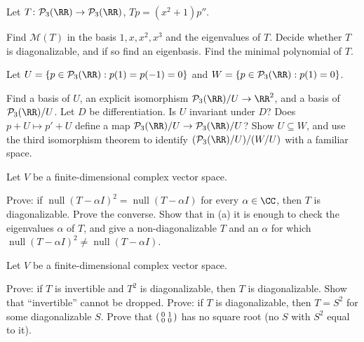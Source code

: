 \documentclass[10pt]{scrartcl}
\DeclareMathOperator{\nul}{null}
\newcommand{\PP}{\mathcal P}
\newcommand{\MM}{\mathcal M}
\begin{document}
\begin{problem}
  Let $T\colon\PP_3(\RR)\to\PP_3(\RR)$, $Tp=(x^2+1)p''$.
  \begin{enumerate}[(a)]
    \ii Find $\MM(T)$ in the basis $1,x,x^2,x^3$ and the eigenvalues of $T$.
    \ii Decide whether $T$ is diagonalizable, and if so find an eigenbasis.
    \ii Find the minimal polynomial of $T$.
  \end{enumerate}
\end{problem}

\begin{problem}[$\star$ A quotient of $\PP_3(\RR)$ (HW5 P1 style)]
  Let $U=\{p\in\PP_3(\RR):p(1)=p(-1)=0\}$ and $W=\{p\in\PP_3(\RR):p(1)=0\}$.
  \begin{enumerate}[(a)]
    \ii Find a basis of $U$, an explicit isomorphism $\PP_3(\RR)/U\to\RR^2$, and a basis of $\PP_3(\RR)/U$.
    \ii Let $D$ be differentiation. Is $U$ invariant under $D$? Does $p+U\mapsto p'+U$ define a map $\PP_3(\RR)/U\to\PP_3(\RR)/U$?
    \ii Show $U\subseteq W$, and use the third isomorphism theorem to identify $(\PP_3(\RR)/U)/(W/U)$ with a familiar space.
  \end{enumerate}
\end{problem}

\begin{problem}
  Let $V$ be a finite-dimensional complex vector space.
  \begin{enumerate}[(a)]
    \ii Prove: if $\nul(T-\alpha I)^2=\nul(T-\alpha I)$ for every $\alpha\in\CC$, then $T$ is diagonalizable.
    \ii Prove the converse.
    \ii Show that in (a) it is enough to check the eigenvalues $\alpha$ of $T$, and give a non-diagonalizable $T$ and an $\alpha$ for which $\nul(T-\alpha I)^2\ne\nul(T-\alpha I)$.
  \end{enumerate}
\end{problem}

\begin{problem}
  Let $V$ be a finite-dimensional complex vector space.
  \begin{enumerate}[(a)]
    \ii Prove: if $T$ is invertible and $T^2$ is diagonalizable, then $T$ is diagonalizable.
    \ii Show that ``invertible'' cannot be dropped.
    \ii Prove: if $T$ is diagonalizable, then $T=S^2$ for some diagonalizable $S$.
    \ii Prove that $\begin{psmallmatrix}0&1\\0&0\end{psmallmatrix}$ has no square root (no $S$ with $S^2$ equal to it).
  \end{enumerate}
\end{problem}
\end{document}
